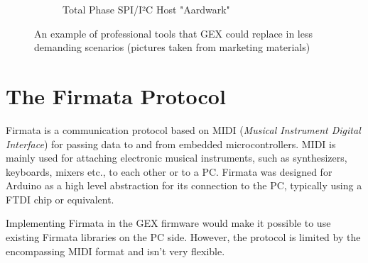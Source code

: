 \begin{figure}
\begin{subfigure}{.5\textwidth}
		\caption{Total Phase SPI/I²C Host "Aardwark"}
	\end{subfigure}
	\caption[Professional tools that GEX can replace]{\label{fig:profidaq}An example of professional tools that GEX could replace in less demanding scenarios (pictures taken from marketing materials)}
\end{figure}


\section{The Firmata Protocol}


Firmata is a communication protocol based on MIDI (\textit{Musical Instrument Digital Interface}) for passing data to and from embedded microcontrollers. MIDI is mainly used for attaching electronic musical instruments, such as synthesizers, keyboards, mixers etc., to each other or to a PC. Firmata was designed for Arduino as a high level abstraction for its connection to the PC, typically using a FTDI chip or equivalent.

Implementing Firmata in the GEX firmware would make it possible to use existing Firmata libraries on the PC side. However, the protocol is limited by the encompassing MIDI format and isn't very flexible. 

